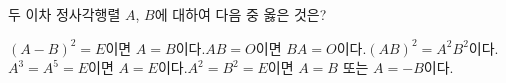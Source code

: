 \hspace*{2mm}\begin{minipage}[t]{\dimexpr\linewidth-2mm\relax}\vspace{0pt}
두 이차 정사각행렬 $A$, $B$에 대하여 다음 중 옳은 것은?
\begin{choicesv}{$(A-B)^2=E$이면 $A=B$이다.}{$AB=O$이면 $BA=O$이다.}{$(AB)^2=A^2B^2$이다.}{$A^3=A^5=E$이면 $A=E$이다.}{$A^2=B^2=E$이면 $A=B$ 또는 $A=-B$이다.}\end{choicesv}\end{minipage}
